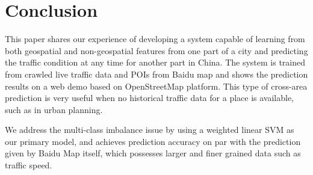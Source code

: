 \section{Conclusion}

This paper shares our experience of developing a system capable 
of learning from both geospatial and non-geospatial features from 
one part of a city and predicting the traffic condition at 
any time for another part in China. The system is trained from crawled
live traffic data and POIs from Baidu map and shows the 
prediction results on a web demo based on OpenStreetMap platform.
This type of cross-area prediction is very useful when no historical
traffic data for a place is available, such as in urban planning.
 
We address the multi-class imbalance issue by using a weighted linear SVM
as our primary model, and achieves prediction accuracy on par with
the prediction given by Baidu Map itself, which possesses larger and
finer grained data such as traffic speed. 

